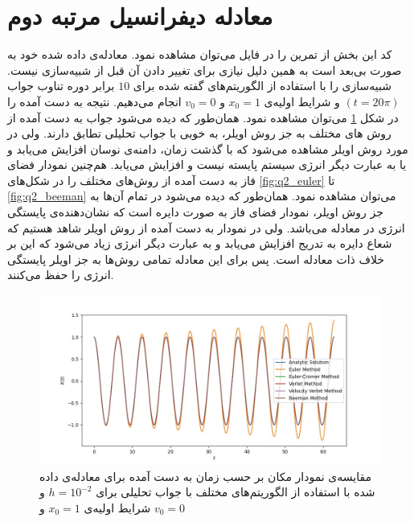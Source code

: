 \documentclass[11pt, a4paper]{article}
\begin{document}
\section{\textbf{معادله دیفرانسیل مرتبه دوم}}
کد این بخش از تمرین را در فایل
می‌توان مشاهده نمود.
معادله‌ی داده شده خود به صورت بی‌بعد است به همین دلیل نیازی برای تغییر دادن آن قبل از شبیه‌سازی نیست.
شبیه‌سازی را با استفاده از الگوریتم‌های گفته شده برای
$10$
برابر دوره تناوب جواب
$(t = 20\pi)$
و شرایط اولیه‌ی
$x_0 = 1$
و
$v_0 = 0$
انجام می‌دهیم.
نتیجه به دست آمده را در شکل
\ref{fig:q2_x_t}
می‌توان مشاهده نمود.
همان‌طور که دیده می‌شود جواب به دست آمده از روش های مختلف به جز روش اویلر،
به خوبی با جواب تحلیلی تطابق دارند.
ولی در مورد روش اویلر مشاهده می‌شود که با گذشت زمان،
دامنه‌ی نوسان افزایش می‌یابد و یا به عبارت دیگر انرژی سیستم پایسته نیست و افزایش می‌یابد.
هم‌چنین نمودار فضای فاز به دست آمده از روش‌های مختلف را در شکل‌های
\ref{fig:q2_euler}
تا
\ref{fig:q2_beeman}
می‌توان مشاهده نمود.
همان‌طور که دیده می‌شود در تمام ‌آن‌ها به جز روش اویلر،
نمودار فضای فاز به صورت دایره‌ است که نشان‌دهنده‌ی پایستگی انرژی در معادله می‌باشد.
ولی در نمودار به دست آمده از روش اویلر شاهد هستیم که شعاع دایره به تدریج افزایش می‌یابد و
به عبارت دیگر انرژی زیاد می‌شود که این بر خلاف ذات معادله است.
پس برای این معادله تمامی‌ روش‌ها به جز اویلر پایستگی انرژی را حفظ می‌کنند.

\begin{figure}
  \includegraphics[width=\textwidth]{q2_x_t_0_62.83185307179586_0.01_[1, 0].jpg}
  \caption{مقایسه‌ی نمودار مکان بر حسب زمان به دست آمده برای معادله‌ی داده شده با استفاده از الگوریتم‌های مختلف با جواب تحلیلی برای $h = 10^{-2}$ و شرایط اولیه‌ی $x_0 = 1$ و $v_0 = 0$}
  \label{fig:q2_x_t}
\end{figure}
\end{document}
